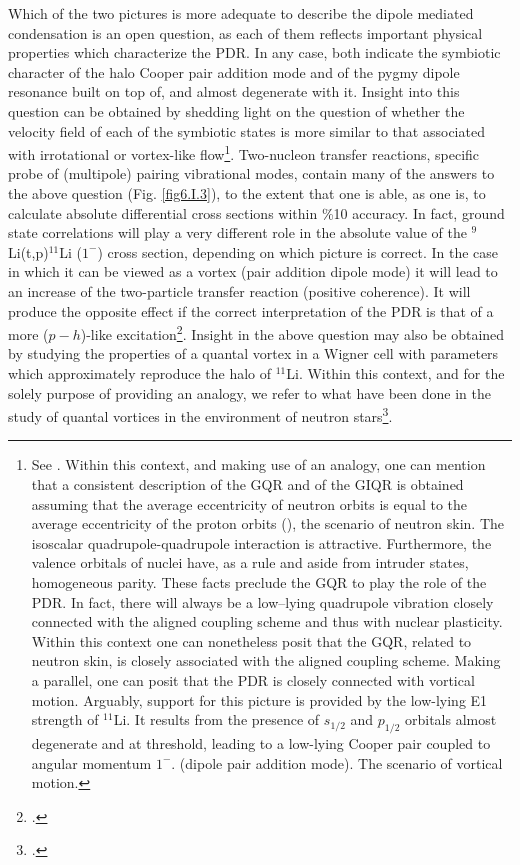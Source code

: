 \begin{subappendices}
Which of the two  pictures is more adequate to describe  the dipole mediated condensation is an open question,  
as each of them reflects  important physical properties which   characterize  the PDR. In any case, both indicate the symbiotic character  of the halo Cooper pair  addition mode  and of the pygmy dipole resonance  built on top of, and almost degenerate with it. 
Insight into this question can be obtained  by shedding light on the question  of whether  the velocity field of each of the symbiotic  states is more similar  to that associated  with irrotational or vortex-like flow\footnote{See \cite{Repko:13}. Within this context, and making use of an analogy, one can  mention that a consistent description of the GQR and of the GIQR is obtained 
assuming that the average eccentricity of neutron orbits 
is equal to the average eccentricity of the proton orbits (\cite{Bes:75c}), the scenario of neutron skin.
The  isoscalar quadrupole-quadrupole interaction is attractive. Furthermore, 
the valence orbitals of nuclei have, as a rule and aside from intruder states, homogeneous parity. These facts  preclude 
the GQR to play the role of the PDR. In fact, there will always be a low--lying quadrupole vibration closely 
connected with the aligned coupling scheme and thus  with nuclear plasticity. Within this context one can  nonetheless  posit  that the GQR, related to neutron skin,  is closely associated with the aligned coupling scheme.
Making a parallel, one can posit  that the PDR is closely connected with vortical motion. 
Arguably,  support for this picture is provided by the   low-lying  E1 
strength of $^{11}$Li. It  results from the presence of $s_{1/2}$ and $p_{1/2}$ orbitals almost degenerate and at threshold, 
leading to a low-lying Cooper pair coupled to angular momentum $1^-$. (dipole pair addition mode). 
The  scenario of vortical motion. }. Two-nucleon transfer reactions, specific probe  of (multipole) pairing vibrational modes, contain many of the answers to the above question (Fig. \ref{fig6.I.3}), to the extent that one is able, as one is, to calculate absolute differential cross sections within \%10 accuracy.
In fact,  ground state correlations will play a very different role in the absolute value of the $^9$Li(t,p)$^{11}$Li ($1^-$) cross section,
depending  on which picture is correct. In the case in which 
it can be 
 viewed as a vortex (pair addition dipole mode) it will lead to an increase of the two-particle transfer reaction 
 (positive coherence).
 It will  produce the opposite effect if the correct interpretation of the PDR   is that of a 
more ($p-h$)-like excitation\footnote{ \cite{Broglia:71}.}. 
Insight  in the above question may also be obtained by studying  the properties of
a quantal vortex in a Wigner cell with parameters which approximately reproduce 
the halo of $^{11}$Li. Within this context, and  for the solely purpose of providing an analogy, we refer 
to what have been  done in the study of quantal vortices in the environment of neutron stars\footnote{\cite{Avogadro:07,Avogadro:08}.}.



\end{subappendices}
